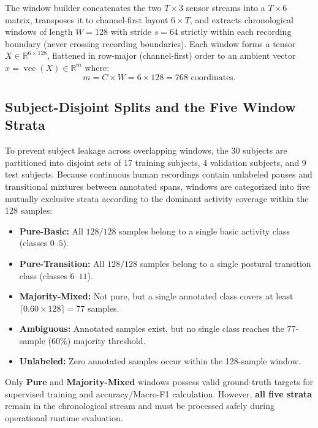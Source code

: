 \documentclass[11pt,a4paper]{article}
\newcommand{\R}{\mathbb{R}}
\newcommand{\vecop}{\operatorname{vec}}
\theoremstyle{remark}
\begin{document}
The window builder concatenates the two $T \times 3$ sensor streams into a $T \times 6$ matrix, transposes it to channel-first layout $6 \times T$, and extracts chronological windows of length $W = 128$ with stride $s = 64$ strictly within each recording boundary (never crossing recording boundaries). Each window forms a tensor $X \in \R^{6 \times 128}$, flattened in row-major (channel-first) order to an ambient vector $x = \vecop(X) \in \R^{m}$ where:
\begin{equation}
  m = C \times W = 6 \times 128 = 768 \text{ coordinates}.
\end{equation}

\subsection{Subject-Disjoint Splits and the Five Window Strata}
To prevent subject leakage across overlapping windows, the 30 subjects are partitioned into disjoint sets of 17 training subjects, 4 validation subjects, and 9 test subjects. Because continuous human recordings contain unlabeled pauses and transitional mixtures between annotated spans, windows are categorized into five mutually exclusive strata according to the dominant activity coverage within the 128 samples:
\begin{itemize}
  \item \textbf{Pure-Basic:} All $128/128$ samples belong to a single basic activity class (classes $0$--$5$).
  \item \textbf{Pure-Transition:} All $128/128$ samples belong to a single postural transition class (classes $6$--$11$).
  \item \textbf{Majority-Mixed:} Not pure, but a single annotated class covers at least $\lceil 0.60 \times 128 \rceil = 77$ samples.
  \item \textbf{Ambiguous:} Annotated samples exist, but no single class reaches the 77-sample ($60\%$) majority threshold.
  \item \textbf{Unlabeled:} Zero annotated samples occur within the 128-sample window.
\end{itemize}

Only \textbf{Pure} and \textbf{Majority-Mixed} windows possess valid ground-truth targets for supervised training and accuracy/Macro-F1 calculation. However, \textbf{all five strata} remain in the chronological stream and must be processed safely during operational runtime evaluation.
\end{document}
